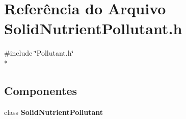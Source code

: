 \section{Referência do Arquivo Solid\+Nutrient\+Pollutant.\+h}
\label{_solid_nutrient_pollutant_8h}
{\ttfamily \#include \char`\"{}Pollutant.\+h\char`\"{}}\\*
\subsection*{Componentes}
\begin{DoxyCompactItemize}
\item 
class {\bf Solid\+Nutrient\+Pollutant}
\end{DoxyCompactItemize}
